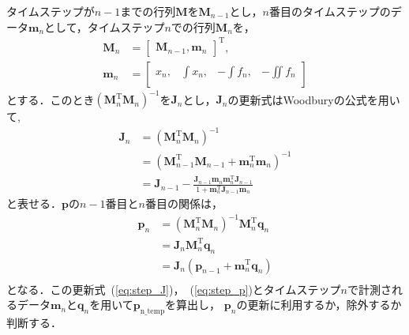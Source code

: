 \documentclass[a4paper]{jarticle}
\begin{document}
タイムステップが$n-1$までの行列$\mathbf{M}$を$\mathbf{M}_{n-1}$とし，$n$番目のタイムステップのデータ$\mathbf{m}_n$として，タイムステップ$n$での行列$\mathbf{M}_n$を，
\begin{equation}
    \begin{aligned}
        \mathbf{M}_n &= \begin{bmatrix}
            \mathbf{M}_{n-1} ,\mathbf{m}_n
        \end{bmatrix}^{\mathrm{T}},\\
        \mathbf{m}_{n}&=\begin{bmatrix}
            x_{n}, & \int{x_{n}}, & -\int{f_{n}},& -\iint{f_{n}}\\
        \end{bmatrix}
    \end{aligned}
\end{equation}
とする．このとき$(\mathbf{M}_{n}^{\mathrm{T}}\mathbf{M}_{n})^{-1}$を$\mathbf{J}_{n}$とし，$\mathbf{J}_{n}$の更新式はWoodburyの公式を用いて,
\begin{equation}
    \begin{aligned}
    \mathbf{J}_n &= (\mathbf{M}_{n}^{\mathrm{T}}\mathbf{M}_{n})^{-1}\\
                 &= (\mathbf{M}_{n-1}^{\mathrm{T}}\mathbf{M}_{n-1} + \mathbf{m}_{n}^{\mathrm{T}}\mathbf{m}_{n})^{-1}\\
                 &= \mathbf{J}_{n-1} - \frac{\mathbf{J}_{n-1}\mathbf{m}_{n}\mathbf{m}_{n}^{\mathrm{T}}\mathbf{J}_{n-1}}{1+\mathbf{m}_{n}^{\mathrm{T}}\mathbf{J}_{n-1}\mathbf{m}_{n}}
    \end{aligned}
    \label{eq:step_J}
\end{equation}
と表せる．$\mathbf{p}$の$n-1$番目と$n$番目の関係は，
\begin{equation}
    \begin{aligned}
    \mathbf{p}_n &= (\mathbf{M}_{n}^{\mathrm{T}}\mathbf{M}_{n})^{-1}\mathbf{M}_{n}^{\mathrm{T}}\mathbf{q}_{n}\\
                 &= \mathbf{J}_{n}\mathbf{M}_{n}^{\mathrm{T}}\mathbf{q}_{n}\\
                 &= \mathbf{J}_{n}(\mathbf{p}_{n-1}+\mathbf{m}_{n}^{\mathrm{T}}\mathbf{q}_{n})\\
    \end{aligned}
    \label{eq:step_p}
\end{equation}
となる．この更新式~(\ref{eq:step_J})，~(\ref{eq:step_p})とタイムステップ$n$で計測されるデータ$\mathbf{m}_{n}$と$\mathbf{q}_{n}$を用いて$\mathbf{p}_{\mathrm{n\_temp}}$を算出し，
$\mathbf{p}_{n}$の更新に利用するか，除外するか判断する．
\end{document}
